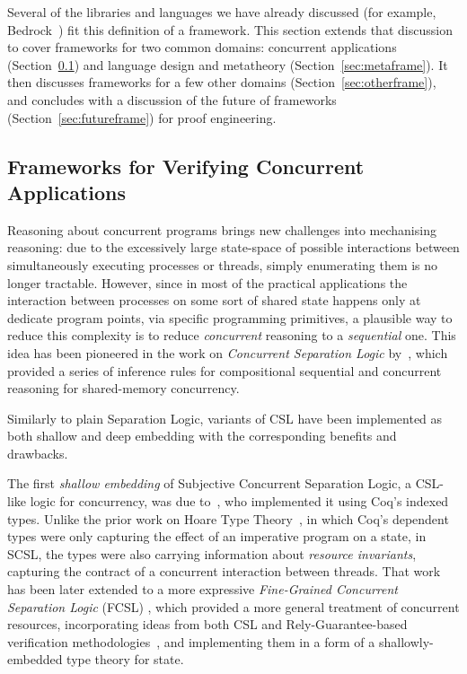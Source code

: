 Several of the libraries and languages we have already discussed (for example, Bedrock~\citep{Chlipala2013})
fit this definition of a framework. This section extends that discussion to cover frameworks
for two common domains: concurrent applications (Section~\ref{sec:reas-about-conc}) and language design and metatheory (Section~\ref{sec:metaframe}).
It then discusses frameworks for a few other domains (Section~\ref{sec:otherframe}), and concludes with
a discussion of the future of frameworks (Section~\ref{sec:futureframe}) for proof engineering.

\subsection{Frameworks for Verifying Concurrent Applications}
\label{sec:reas-about-conc}

Reasoning about concurrent programs brings new challenges into
mechanising reasoning: due to the excessively large state-space of
possible interactions between simultaneously executing processes or
threads, simply enumerating them is no longer tractable.
%
However, since in most of the practical applications the interaction
between processes on some sort of shared state happens only at
dedicate program points, via specific programming primitives, a
plausible way to reduce this complexity is to reduce \emph{concurrent}
reasoning to a \emph{sequential} one.
%
This idea has been pioneered in the work on \emph{Concurrent
  Separation Logic} by~\cite{ohearn07resources}, which
provided a series of inference rules for compositional sequential and
concurrent reasoning for shared-memory concurrency.

Similarly to plain Separation Logic, variants of CSL have been
implemented as both shallow and deep embedding with the corresponding
benefits and drawbacks.

The first \emph{shallow embedding} of Subjective Concurrent Separation
Logic, a CSL-like logic for concurrency, was due
to~\cite{LeyWild-Nanevski:POPL13}, who implemented it using Coq's
indexed types. Unlike the prior work on Hoare Type
Theory~\citep{Nanevski-al:POPL10}, in which Coq's dependent types were
only capturing the effect of an imperative program on a state, in
SCSL, the types were also carrying information about \emph{resource
  invariants}, capturing the contract of a concurrent interaction
between threads.
%
That work has been later extended to a more expressive
\emph{Fine-Grained Concurrent Separation Logic} (FCSL)
\citep{Nanevski-al:ESOP14,Sergey-al:PLDI15}, which provided a more
general treatment of concurrent resources, incorporating ideas from
both CSL and Rely-Guarantee-based verification
methodologies~\citep{Jones:IFIP83,Feng:POPL09}, and implementing them
in a form of a shallowly-embedded type theory for state.

